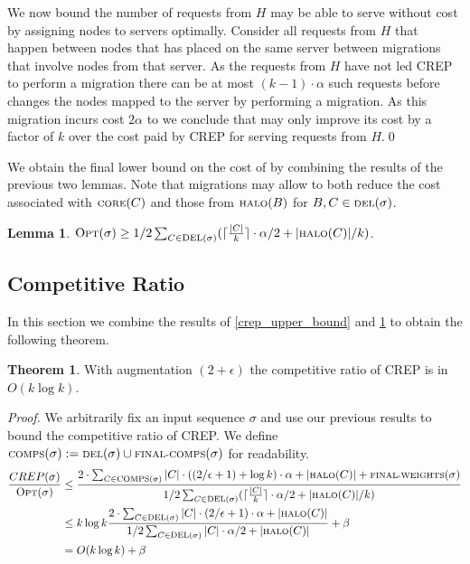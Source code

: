 \documentclass[a4paper,xcolor=dvipsnames, tikz, 12pt]{article}
\newcommand{\nl}{\newline}
\newcommand{\crep}{C{\scriptsize REP}}
\newcommand{\del}{\text{\scriptsize DEL}}
\newcommand{\opt}{\text{O{\scriptsize PT}}}
\newcommand{\core}{\text{\scriptsize CORE}}
\newcommand{\halo}{\text{\scriptsize HALO}}
\newcommand{\finalComps}{\text{\scriptsize FINAL-COMPS}}
\newcommand{\finalWeights}{\text{\scriptsize FINAL-WEIGHTS}}
\newcommand{\comps}{\text{\scriptsize COMPS}}
\theoremstyle{definition}
\newtheorem{theo}[defi]{Theorem}
\newtheorem{lemma}[defi]{Lemma}
\begin{document}
We now bound the number of requests from $H$ \opt{} may be able to serve without cost by assigning nodes to servers optimally. Consider all requests from $H$ that happen between nodes that \opt{} has placed on the same server between \opt{} migrations that involve nodes from that server. As the requests from $H$ have not led \crep{} to perform a migration there can be at most $(k-1)\cdot\alpha$ such requests before \opt{} changes the nodes mapped to the server by performing a migration. As this migration incurs cost $2\alpha$ to \opt{} we conclude that \opt{} may only improve its cost by a factor of $k$ over the cost paid by \crep{} for serving requests from $H$.\qed\nl

We obtain the final lower bound on the cost of \opt{} by combining the results of the previous two lemmas. Note that migrations may allow \opt{} to both reduce the cost associated with $\core(C)$ and those from $\halo(B)$ for $B,C\in\del(\sigma)$.

\begin{lemma}
	\label{opt_lower_bound}
	$\opt{}(\sigma)\geq1/2\sum_{C\in\del{}(\sigma)}(\lceil\frac{|C|}{k}\rceil\cdot\alpha/2+|\halo(C)|/k)$.
\end{lemma}

\subsection{Competitive Ratio}
In this section we combine the results of \cref{crep_upper_bound} and \cref{opt_lower_bound} to obtain the following theorem.

\begin{theo}
	With augmentation $(2+\epsilon)$ the competitive ratio of \crep{} is in $O(k \log k)$.
\end{theo}

\textit{Proof.} We arbitrarily fix an input sequence $\sigma$ and use our previous results to bound the competitive ratio of \crep{}. We define $\comps(\sigma):=\del{}(\sigma)\cup\finalComps(\sigma)$ for readability.
\begin{align*}
\frac{\crep{}(\sigma)}{\opt(\sigma)} &\leq\frac{2\cdot\sum_{C\in\comps(\sigma)}|C|\cdot((2/\epsilon+1)+\log k)\cdot\alpha+|\halo(C)|+\finalWeights(\sigma)}{1/2\sum_{C\in\del{}(\sigma)}(\lceil\frac{|C|}{k}\rceil\cdot\alpha/2+|\halo(C)|/k)}\\
&\leq k \log k\frac{2\cdot\sum_{C\in\del(\sigma)}|C|\cdot(2/\epsilon+1) \cdot\alpha+|\halo(C)|}{1/2\sum_{C\in\del{}(\sigma)}{|C|\cdot\alpha/2+|\halo(C)|}}+\beta\\
& = O(k \log k) +\beta
\end{align*}
\end{document}

